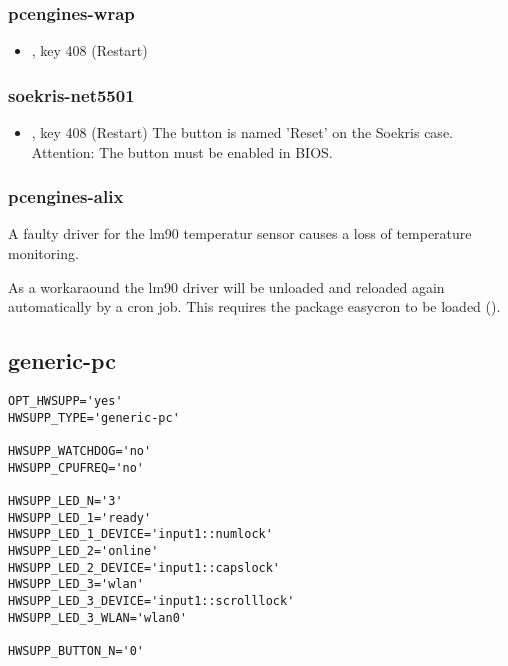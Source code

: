 \subsubsection{pcengines-wrap} 
\begin{itemize}
  \item {}, key 408 (Restart)
\end{itemize}

\subsubsection{soekris-net5501}
\begin{itemize}
  \item {}, key 408 (Restart)
  \newline The button is named 'Reset' on the Soekris case. 
  \newline Attention: The button must be enabled in BIOS.
\end{itemize}


\subsubsection{pcengines-alix}
A faulty driver for the lm90 temperatur sensor causes a loss of temperature 
monitoring.

As a workaraound the lm90 driver will be unloaded and reloaded again
automatically by a cron job. This requires the package easycron to be loaded
().


\subsection{generic-pc}

\begin{verbatim}
OPT_HWSUPP='yes'
HWSUPP_TYPE='generic-pc'

HWSUPP_WATCHDOG='no'
HWSUPP_CPUFREQ='no'

HWSUPP_LED_N='3'
HWSUPP_LED_1='ready'
HWSUPP_LED_1_DEVICE='input1::numlock'
HWSUPP_LED_2='online'
HWSUPP_LED_2_DEVICE='input1::capslock'
HWSUPP_LED_3='wlan'
HWSUPP_LED_3_DEVICE='input1::scrolllock'
HWSUPP_LED_3_WLAN='wlan0'

HWSUPP_BUTTON_N='0'

\end{verbatim}

